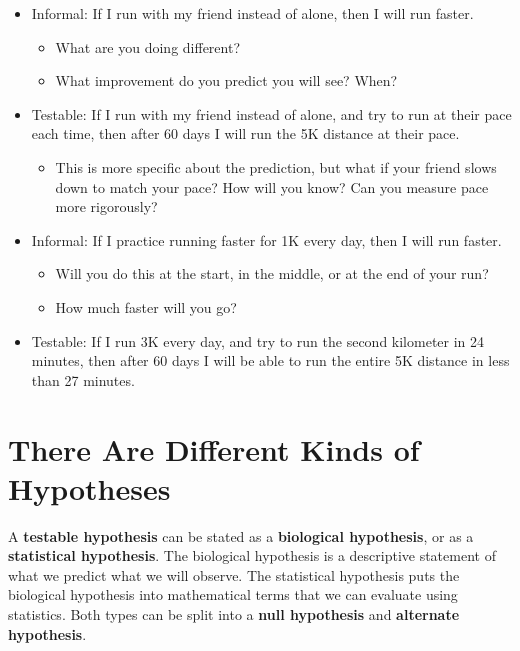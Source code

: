 \documentclass[
]{book}
\providecommand{\tightlist}{%
  \setlength{\itemsep}{0pt}\setlength{\parskip}{0pt}}
\begin{document}
\begin{itemize}
\tightlist
\item
  Informal: If I run with my friend instead of alone, then I will run faster.

  \begin{itemize}
  \tightlist
  \item
    What are you doing different?
  \item
    What improvement do you predict you will see? When?
  \end{itemize}
\item
  Testable: If I run with my friend instead of alone, and try to run at their pace each time, then after 60 days I will run the 5K distance at their pace.

  \begin{itemize}
  \tightlist
  \item
    This is more specific about the prediction, but what if your friend slows down to match your pace? How will you know? Can you measure pace more rigorously?
  \end{itemize}
\end{itemize}

\begin{itemize}
\tightlist
\item
  Informal: If I practice running faster for 1K every day, then I will run faster.

  \begin{itemize}
  \tightlist
  \item
    Will you do this at the start, in the middle, or at the end of your run?
  \item
    How much faster will you go?
  \end{itemize}
\item
  Testable: If I run 3K every day, and try to run the second kilometer in 24 minutes, then after 60 days I will be able to run the entire 5K distance in less than 27 minutes.
\end{itemize}

\hypertarget{there-are-different-kinds-of-hypotheses}{%
\section{There Are Different Kinds of Hypotheses}\label{there-are-different-kinds-of-hypotheses}}

A \textbf{testable hypothesis} can be stated as a \textbf{biological hypothesis}, or as a \textbf{statistical hypothesis}. The biological hypothesis is a descriptive statement of what we predict what we will observe. The statistical hypothesis puts the biological hypothesis into mathematical terms that we can evaluate using statistics. Both types can be split into a \textbf{null hypothesis} and \textbf{alternate hypothesis}.
\end{document}
